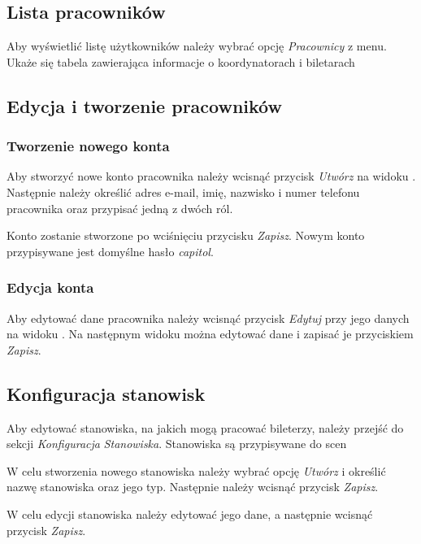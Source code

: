 \documentclass[shortabstract]{iithesis}
\begin{document}
\subsection{Lista pracowników}
\label{user-list}

Aby wyświetlić listę użytkowników należy wybrać opcję \textit{Pracownicy} z menu. Ukaże się tabela zawierająca informacje o koordynatorach i biletarach


\subsection{Edycja i tworzenie pracowników}

\subsubsection{Tworzenie nowego konta}

Aby stworzyć nowe konto pracownika należy wcisnąć przycisk \textit{Utwórz} na widoku . Następnie należy określić adres e-mail, imię, nazwisko i numer telefonu pracownika oraz przypisać jedną z dwóch ról.

Konto zostanie stworzone po wciśnięciu przycisku \textit{Zapisz}. Nowym konto przypisywane jest domyślne hasło \textit{capitol}.


\subsubsection{Edycja konta}

Aby edytować dane pracownika należy wcisnąć przycisk \textit{Edytuj} przy jego danych na widoku . Na następnym widoku można edytować dane i zapisać je przyciskiem \textit{Zapisz}.

\subsection{Konfiguracja stanowisk}

Aby edytować stanowiska, na jakich mogą pracować bileterzy, należy przejść do sekcji \textit{Konfiguracja} \rightarrow \textit{Stanowiska}. Stanowiska są przypisywane do scen

W celu stworzenia nowego stanowiska należy wybrać opcję \textit{Utwórz} i określić nazwę stanowiska oraz jego typ. Następnie należy wcisnąć przycisk \textit{Zapisz}.

W celu edycji stanowiska należy edytować jego dane, a następnie wcisnąć przycisk \textit{Zapisz}.






\end{document}
